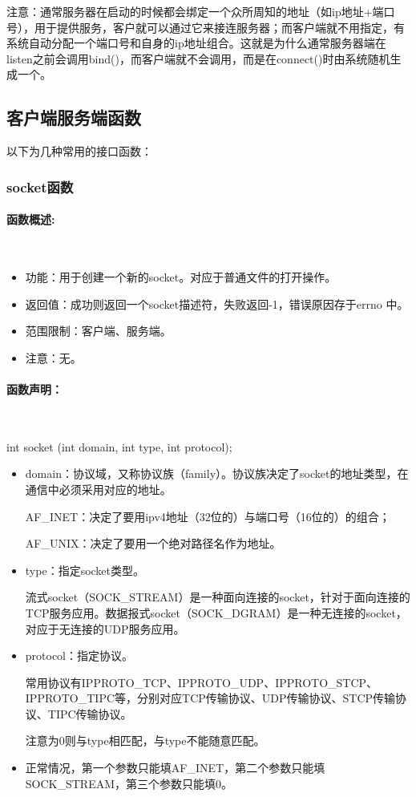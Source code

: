 \documentclass[UTF8]{article}%
\begin{document}
注意：通常服务器在启动的时候都会绑定一个众所周知的地址（如ip地址+端口号），用于提供服务，客户就可以通过它来接连服务器；而客户端就不用指定，有系统自动分配一个端口号和自身的ip地址组合。这就是为什么通常服务器端在listen之前会调用bind()，而客户端就不会调用，而是在connect()时由系统随机生成一个。

\subsection{客户端服务端函数}

以下为几种常用的接口函数：

\subsubsection{socket函数}

\paragraph{函数概述:}~{}

\begin{itemize}
    \item 功能：用于创建一个新的socket。对应于普通文件的打开操作。
    \item 返回值：成功则返回一个socket描述符，失败返回-1，错误原因存于errno 中。
    \item 范围限制：客户端、服务端。
    \item 注意：无。
\end{itemize}

\paragraph{函数声明：}~{}

int socket (int domain, int type, int protocol);

\begin{itemize}
    \item domain：协议域，又称协议族（family）。协议族决定了socket的地址类型，在通信中必须采用对应的地址。
    
        AF\_INET：决定了要用ipv4地址（32位的）与端口号（16位的）的组合；

        AF\_UNIX：决定了要用一个绝对路径名作为地址。

    \item type：指定socket类型。
    
        流式socket（SOCK\_STREAM）是一种面向连接的socket，针对于面向连接的TCP服务应用。数据报式socket（SOCK\_DGRAM）是一种无连接的socket，对应于无连接的UDP服务应用。

    \item protocol：指定协议。
    
        常用协议有IPPROTO\_TCP、IPPROTO\_UDP、IPPROTO\_STCP、IPPROTO\_TIPC等，分别对应TCP传输协议、UDP传输协议、STCP传输协议、TIPC传输协议。

        注意为0则与type相匹配，与type不能随意匹配。

    \item 正常情况，第一个参数只能填AF\_INET，第二个参数只能填SOCK\_STREAM，第三个参数只能填0。
\end{itemize}
\end{document}

